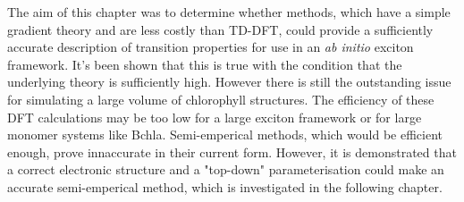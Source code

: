 The aim of this chapter was to determine whether \dscf methods, which have a simple
gradient theory and are less costly than TD-DFT, could provide a sufficiently accurate
description of transition properties for use in an \emph{ab initio} exciton framework.
It's been shown that this is true with the condition that the underlying theory
is sufficiently high. However there is still the outstanding issue for simulating 
a large volume of  chlorophyll structures. The efficiency of these DFT calculations 
may be too low for a large exciton framework or for large monomer systems like Bchla.
Semi-emperical \dscf methods, which would be efficient enough, prove innaccurate 
in their current form. However, it is demonstrated that a correct electronic structure
and a "top-down" parameterisation could make an accurate semi-emperical method, 
which is investigated in the following chapter.
